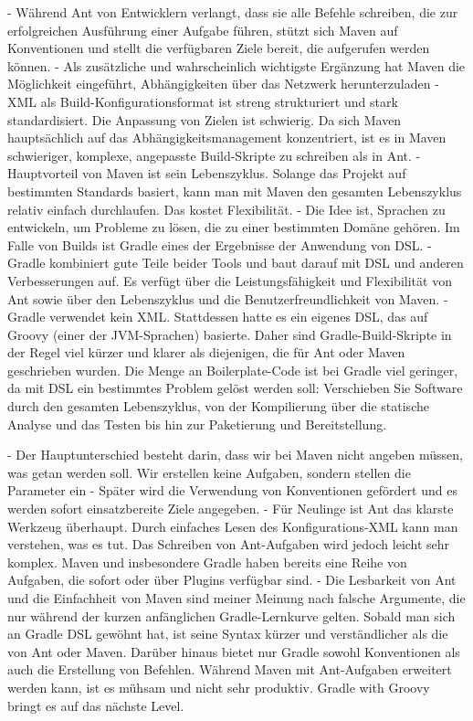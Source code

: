 		- Während Ant von Entwicklern verlangt, dass sie alle Befehle schreiben, die zur erfolgreichen Ausführung einer Aufgabe führen, stützt sich Maven auf Konventionen und stellt die verfügbaren Ziele bereit, die aufgerufen werden können.
		- Als zusätzliche und wahrscheinlich wichtigste Ergänzung hat Maven die Möglichkeit eingeführt, Abhängigkeiten über das Netzwerk herunterzuladen
		- XML als Build-Konfigurationsformat ist streng strukturiert und stark standardisiert. Die Anpassung von Zielen ist schwierig. Da sich Maven hauptsächlich auf das Abhängigkeitsmanagement konzentriert, ist es in Maven schwieriger, komplexe, angepasste Build-Skripte zu schreiben als in Ant.
		- Hauptvorteil von Maven ist sein Lebenszyklus. Solange das Projekt auf bestimmten Standards basiert, kann man mit Maven den gesamten Lebenszyklus relativ einfach durchlaufen. Das kostet Flexibilität.
		- Die Idee ist, Sprachen zu entwickeln, um Probleme zu lösen, die zu einer bestimmten Domäne gehören. Im Falle von Builds ist Gradle eines der Ergebnisse der Anwendung von DSL.
		- Gradle kombiniert gute Teile beider Tools und baut darauf mit DSL und anderen Verbesserungen auf. Es verfügt über die Leistungsfähigkeit und Flexibilität von Ant sowie über den Lebenszyklus und die Benutzerfreundlichkeit von Maven.
		- Gradle verwendet kein XML. Stattdessen hatte es ein eigenes DSL, das auf Groovy (einer der JVM-Sprachen) basierte. Daher sind Gradle-Build-Skripte in der Regel viel kürzer und klarer als diejenigen, die für Ant oder Maven geschrieben wurden. Die Menge an Boilerplate-Code ist bei Gradle viel geringer, da mit DSL ein bestimmtes Problem gelöst werden soll: Verschieben Sie Software durch den gesamten Lebenszyklus, von der Kompilierung über die statische Analyse und das Testen bis hin zur Paketierung und Bereitstellung.

		- Der Hauptunterschied besteht darin, dass wir bei Maven nicht angeben müssen, was getan werden soll. Wir erstellen keine Aufgaben, sondern stellen die Parameter ein
		- Später wird die Verwendung von Konventionen gefördert und es werden sofort einsatzbereite Ziele angegeben.
		- Für Neulinge ist Ant das klarste Werkzeug überhaupt. Durch einfaches Lesen des Konfigurations-XML kann man verstehen, was es tut. Das Schreiben von Ant-Aufgaben wird jedoch leicht sehr komplex. Maven und insbesondere Gradle haben bereits eine Reihe von Aufgaben, die sofort oder über Plugins verfügbar sind.
		- Die Lesbarkeit von Ant und die Einfachheit von Maven sind meiner Meinung nach falsche Argumente, die nur während der kurzen anfänglichen Gradle-Lernkurve gelten. Sobald man sich an Gradle DSL gewöhnt hat, ist seine Syntax kürzer und verständlicher als die von Ant oder Maven. Darüber hinaus bietet nur Gradle sowohl Konventionen als auch die Erstellung von Befehlen. Während Maven mit Ant-Aufgaben erweitert werden kann, ist es mühsam und nicht sehr produktiv. Gradle with Groovy bringt es auf das nächste Level.

